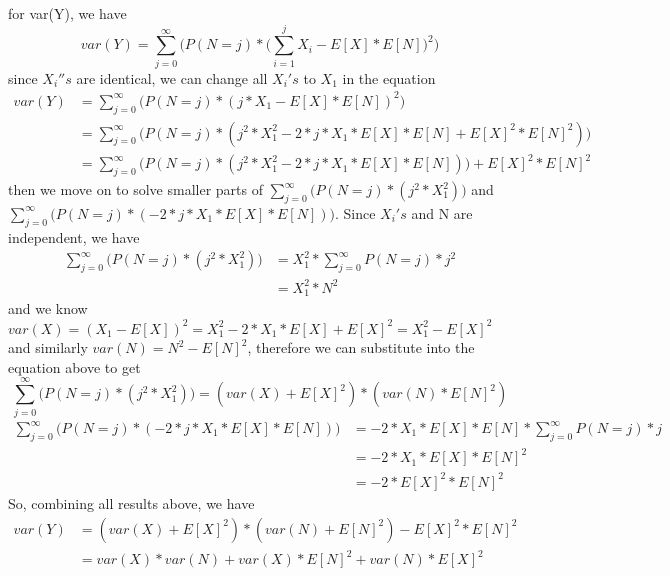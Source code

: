 \documentclass[letterpaper]{article}
\begin{document}
\begin{enumerate}
for var(Y), we have
\begin{equation}
var(Y) = \sum^{\infty}_{j = 0}{\Big(P(N = j) * (\sum^{j}_{i=1}{X_i - E[X] * E[N])^2}\Big)}
\end{equation}
since $X_i''s$ are identical, we can change all $X_i's$ to $X_1$ in the equation
\begin{equation}
\begin{split}
var(Y) &= \sum^{\infty}_{j = 0}{\Big(P(N = j) * (j * X_1 - E[X] * E[N])^2\Big)}\\
          &= \sum^{\infty}_{j = 0}{\Big(P(N = j) * (j^2 * X_1^2 - 2 * j * X_1 * E[X] * E[N] + E[X]^2 * E[N]^2)\Big)}\\
          &= \sum^{\infty}_{j = 0}{\Big(P(N = j) * (j^2 * X_1^2 - 2 * j * X_1 * E[X] * E[N])\Big)} + E[X]^2 * E[N]^2
\end{split}
\end{equation}
then we move on to solve smaller parts of $\sum^{\infty}_{j = 0}{\Big(P(N = j) * (j^2 * X_1^2)\Big)}$ and $\sum^{\infty}_{j = 0}{\Big(P(N = j) * (- 2 * j * X_1 * E[X] * E[N])\Big)}$. Since $X_i's$ and N are independent, we have
\begin{equation}
\begin{split}
\sum^{\infty}_{j = 0}{\Big(P(N = j) * (j^2 * X_1^2)\Big)} &= X_1^2 * \sum^{\infty}_{j = 0}{P(N = j) * j^2}\\
                                                                                     &= X_1^2 * N^2
\end{split}
\end{equation}
and we know $var(X) = (X_1 - E[X])^2 = X_1^2 - 2 * X_1 * E[X] + E[X]^2 = X_1^2 - E[X]^2$ and similarly $var(N) = N^2 - E[N]^2$, therefore we can substitute into the equation above to get
\begin{equation}
\sum^{\infty}_{j = 0}{\Big(P(N = j) * (j^2 * X_1^2)\Big)} = (var(X) + E[X]^2) * (var(N) * E[N]^2)
\end{equation}
\begin{equation}
\begin{split}
\sum^{\infty}_{j = 0}{\Big(P(N = j) * (- 2 * j * X_1 * E[X] * E[N])\Big)} &= - 2 * X_1 * E[X] * E[N] * \sum^{\infty}_{j = 0}{P(N = j) * j}\\
                                                                                                        &= - 2 * X_1 * E[X] * E[N]^2\\
                                                                                                        &= - 2 * E[X]^2 * E[N]^2
\end{split}
\end{equation}
 So, combining all results above, we have
\begin{equation}
\begin{split}
var(Y) &= (var(X) + E[X]^2) * (var(N) + E[N]^2) - E[X]^2 * E[N]^2\\
          &= var(X) * var(N) + var(X) * E[N]^2 + var(N) * E[X]^2
\end{split}
\end{equation}


\end{enumerate}
\end{document}
